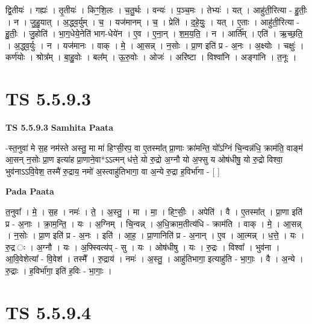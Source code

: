 \documentclass[17pt]{extarticle}
\begin{document}
द्वि॒तीयः॑ । गह्यः॑ । तृ॒तीयः॑ । किꣳ॒॒शि॒लः । च॒तु॒र्थः । वन्यः॑ । प॒ञ्च॒मः । तेभ्यः॑ । यत् । आहु॑ती॒रित्या - हु॒तीः॒ । न । जु॒हु॒यात् । अ॒द्ध्व॒र्युम् । च॒ । यज॑मानम् । च॒ । प्रेति॑ । द॒हे॒युः॒ । यत् । ए॒ताः । आहु॑ती॒रित्या - हु॒तीः॒ । जु॒होति॑ । भा॒ग॒धेये॒नेति॑ भाग-धेये॑न । ए॒व । ए॒ना॒न् । श॒म॒य॒ति॒ । न । आर्ति᳚म् । एति॑ । ऋ॒च्छ॒ति॒ । अ॒द्ध्व॒र्युः । न । यज॑मानः । वाक् । मे॒ । आ॒सन्न् । न॒सोः । प्रा॒ण इति॑ प्र - अ॒नः । अ॒क्ष्योः । चक्षुः॑ । कर्ण॑योः । श्रोत्र᳚म् । बा॒हु॒वोः । बल᳚म् । ऊ॒रु॒वोः । ओजः॑ । अरि॑ष्टा । विश्वा॑नि । अङ्गा॑नि । त॒नूः ।  \newline





\section{ TS 5.5.9.3 }

\textbf{TS 5.5.9.3 } \newline
\textbf{Samhita Paata} \newline

-स्त॒नुवा॑ मे स॒ह नम॑स्ते अस्तु॒ मा मा॑ हिꣳसी॒रप॒ वा ए॒तस्मा᳚त् प्रा॒णाः क्रा॑मन्ति॒ यो᳚ऽग्निं चि॒न्वन्न॑धि॒ क्राम॑ति॒ वाङ्म॑ आ॒सन् न॒सोः प्रा॒ण इत्या॑ह प्रा॒णाने॒वा*ऽऽत्मन् ध॑त्ते॒ यो रु॒द्रो अ॒ग्नौ यो अ॒फ्सु य ओष॑धीषु॒ यो रु॒द्रो विश्वा॒ भुव॑नाऽऽवि॒वेश॒ तस्मै॑ रु॒द्राय॒ नमो॑ अ॒स्त्वाहु॑तिभागा॒ वा अ॒न्ये रु॒द्रा ह॒विर्भा॑गा - [  ] \newline

\textbf{Pada Paata} \newline

त॒नुवा᳚ । मे॒ । स॒ह । नमः॑ । ते॒ । अ॒स्तु॒ । मा । मा॒ । हिꣳ॒॒सीः॒ । अपेति॑ । वै । ए॒तस्मा᳚त् । प्रा॒णा इति॑ प्र - अ॒नाः । क्रा॒म॒न्ति॒ । यः । अ॒ग्निम् । चि॒न्वन्न् । अ॒धि॒क्राम॒तीत्य॑धि - क्राम॑ति । वाक् । मे॒ । आ॒सन्न् । न॒सोः । प्रा॒ण इति॑ प्र - अ॒नः । इति॑ । आ॒ह॒ । प्रा॒णानिति॑ प्र - अ॒नान् । ए॒व । आ॒त्मन्न् । ध॒त्ते॒ । यः । रु॒द्र ः । अ॒ग्नौ । यः । अ॒फ्स्वित्य॑प् - सु । यः । ओष॑धीषु । यः । रु॒द्रः । विश्वा᳚ । भुव॑ना । आ॒वि॒वेशेत्या᳚ - वि॒वेश॑ । तस्मै᳚ । रु॒द्राय॑ । नमः॑ । अ॒स्तु॒ । आहु॑तिभागा॒ इत्याहु॑ति - भा॒गाः॒ । वै । अ॒न्ये । रु॒द्राः । ह॒विर्भा॑गा॒ इति॑ ह॒विः - भा॒गाः॒ ।  \newline





\section{ TS 5.5.9.4 }
\end{document}
